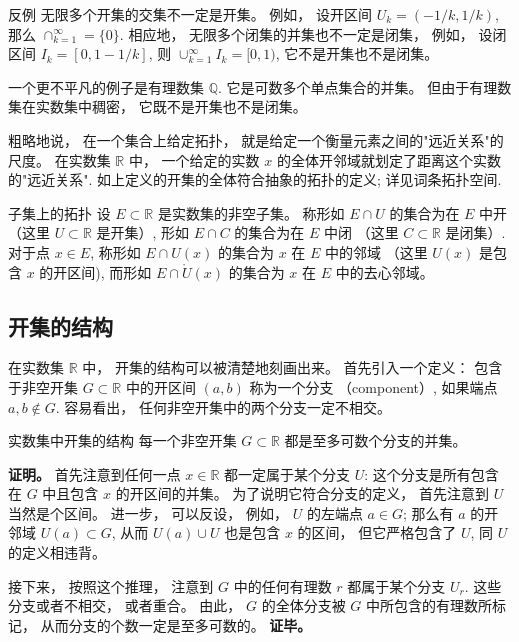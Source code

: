 \begin{example}{反例}
无限多个开集的交集不一定是开集。 例如， 设开区间 $U_k=(-1/k,1/k)$, 那么 $\cap_{k=1}^\infty=\{0\}$. 相应地， 无限多个闭集的并集也不一定是闭集， 例如， 设闭区间 $I_k=[0,1-1/k]$, 则 $\cup_{k=1}^\infty I_k=[0,1)$, 它不是开集也不是闭集。

一个更不平凡的例子是有理数集 $\mathbb{Q}$. 它是可数多个单点集合的并集。 但由于有理数集在实数集中稠密， 它既不是开集也不是闭集。
\end{example}

粗略地说， 在一个集合上给定拓扑， 就是给定一个衡量元素之间的"远近关系"的尺度。 在实数集 $\mathbb{R}$ 中， 一个给定的实数 $x$ 的全体开邻域就划定了距离这个实数的"远近关系". 如上定义的开集的全体符合抽象的拓扑的定义; 详见词条拓扑空间.

\begin{definition}{子集上的拓扑}
设 $E\subset\mathbb{R}$ 是实数集的非空子集。 称形如 $E\cap U$ 的集合为在 $E$ 中开 （这里 $U\subset\mathbb{R}$ 是开集）, 形如 $E\cap C$ 的集合为在 $E$ 中闭 （这里 $C\subset\mathbb{R}$ 是闭集）. 对于点 $x\in E$, 称形如 $E\cap U(x)$ 的集合为 $x$ 在 $E$ 中的邻域 （这里 $U(x)$ 是包含 $x$ 的开区间), 而形如 $E\cap \mathring U(x)$ 的集合为 $x$ 在 $E$ 中的去心邻域。
\end{definition}

\subsection{开集的结构}
在实数集 $\mathbb{R}$ 中， 开集的结构可以被清楚地刻画出来。 首先引入一个定义： 包含于非空开集 $G\subset\mathbb{R}$ 中的开区间 $(a,b)$ 称为一个分支 （component）, 如果端点 $a,b\notin G$. 容易看出， 任何非空开集中的两个分支一定不相交。

\begin{theorem}{实数集中开集的结构}
每一个非空开集 $G\subset\mathbb{R}$ 都是至多可数个分支的并集。 
\end{theorem}
\textbf{证明。} 首先注意到任何一点 $x\in\mathbb{R}$ 都一定属于某个分支 $U$: 这个分支是所有包含在 $G$ 中且包含 $x$ 的开区间的并集。 为了说明它符合分支的定义， 首先注意到 $U$ 当然是个区间。 进一步， 可以反设， 例如， $U$ 的左端点 $a\in G$; 那么有 $a$ 的开邻域 $U(a)\subset G$, 从而 $U(a)\cup U$ 也是包含 $x$ 的区间， 但它严格包含了 $U$, 同 $U$ 的定义相违背。

接下来， 按照这个推理， 注意到 $G$ 中的任何有理数 $r$ 都属于某个分支 $U_r$. 这些分支或者不相交， 或者重合。 由此， $G$ 的全体分支被 $G$ 中所包含的有理数所标记， 从而分支的个数一定是至多可数的。 \textbf{证毕。}


